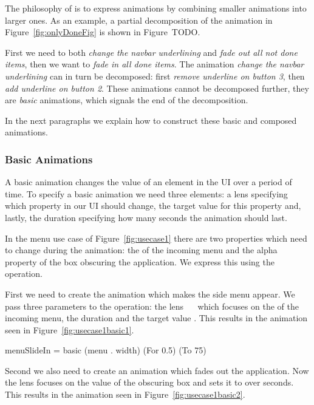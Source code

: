 The philosophy of \dsl{} is to express animations by combining smaller animations into larger ones. As an example, a partial decomposition of the  animation in Figure~\ref{fig:onlyDoneFig} is shown in Figure~TODO.

First we need to both \emph{change the navbar underlining} and \emph{fade out all not done items}, then we want to \emph{fade in all done items}. The animation \emph{change the navbar underlining} can in turn be decomposed: first \emph{remove underline on button 3}, then \emph{add underline on button 2}. These animations cannot be decomposed further, they are \emph{basic} animations, which signals the end of the decomposition.

In the next paragraphs we explain how to construct these basic and composed animations.

\subsubsection{Basic Animations}

A basic animation changes the value of an element in the UI over a period of time. To specify a basic animation we need three elements: a lens specifying which property in our UI should change, the target value for this property and, lastly, the duration specifying how many seconds the animation should last.

In the menu use case of Figure~\ref{fig:usecase1} there are two properties which need to change during the animation: the  of the incoming menu and the alpha property of the box obscuring the application. We express this using the  operation.

First we need to create the animation which makes the side menu appear. We pass three parameters to the  operation: the lens ~~ which focuses on the  of the incoming menu, the duration  and the target value . This results in the animation seen in Figure~\ref{fig:usecase1basic1}.

\begin{spec}
menuSlideIn = basic (menu . width) (For 0.5) (To 75)
\end{spec}

Second we also need to create an animation which fades out the application. Now the lens focuses on the  value of the obscuring box and sets it to  over  seconds. This results in the animation seen in Figure~\ref{fig:usecase1basic2}.

